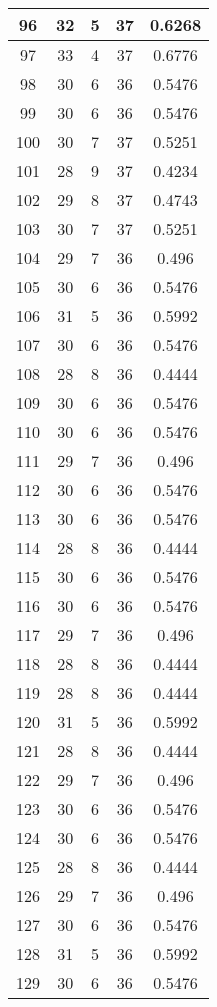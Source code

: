 \documentclass[letterpaper, 12pt]{article}
\begin{document}
\begin{longtable}{|c|c|c|c|c|}
\hline
96 & 32 & 5 & 37 & 0.6268 \\
\hline
97 & 33 & 4 & 37 & 0.6776 \\
\hline
98 & 30 & 6 & 36 & 0.5476 \\
\hline
99 & 30 & 6 & 36 & 0.5476 \\
\hline
100 & 30 & 7 & 37 & 0.5251 \\
\hline
101 & 28 & 9 & 37 & 0.4234 \\
\hline
102 & 29 & 8 & 37 & 0.4743 \\
\hline
103 & 30 & 7 & 37 & 0.5251 \\
\hline
104 & 29 & 7 & 36 & 0.496 \\
\hline
105 & 30 & 6 & 36 & 0.5476 \\
\hline
106 & 31 & 5 & 36 & 0.5992 \\
\hline
107 & 30 & 6 & 36 & 0.5476 \\
\hline
108 & 28 & 8 & 36 & 0.4444 \\
\hline
109 & 30 & 6 & 36 & 0.5476 \\
\hline
110 & 30 & 6 & 36 & 0.5476 \\
\hline
111 & 29 & 7 & 36 & 0.496 \\
\hline
112 & 30 & 6 & 36 & 0.5476 \\
\hline
113 & 30 & 6 & 36 & 0.5476 \\
\hline
114 & 28 & 8 & 36 & 0.4444 \\
\hline
115 & 30 & 6 & 36 & 0.5476 \\
\hline
116 & 30 & 6 & 36 & 0.5476 \\
\hline
117 & 29 & 7 & 36 & 0.496 \\
\hline
118 & 28 & 8 & 36 & 0.4444 \\
\hline
119 & 28 & 8 & 36 & 0.4444 \\
\hline
120 & 31 & 5 & 36 & 0.5992 \\
\hline
121 & 28 & 8 & 36 & 0.4444 \\
\hline
122 & 29 & 7 & 36 & 0.496 \\
\hline
123 & 30 & 6 & 36 & 0.5476 \\
\hline
124 & 30 & 6 & 36 & 0.5476 \\
\hline
125 & 28 & 8 & 36 & 0.4444 \\
\hline
126 & 29 & 7 & 36 & 0.496 \\
\hline
127 & 30 & 6 & 36 & 0.5476 \\
\hline
128 & 31 & 5 & 36 & 0.5992 \\
\hline
129 & 30 & 6 & 36 & 0.5476 \\

\end{longtable}
\end{document}
